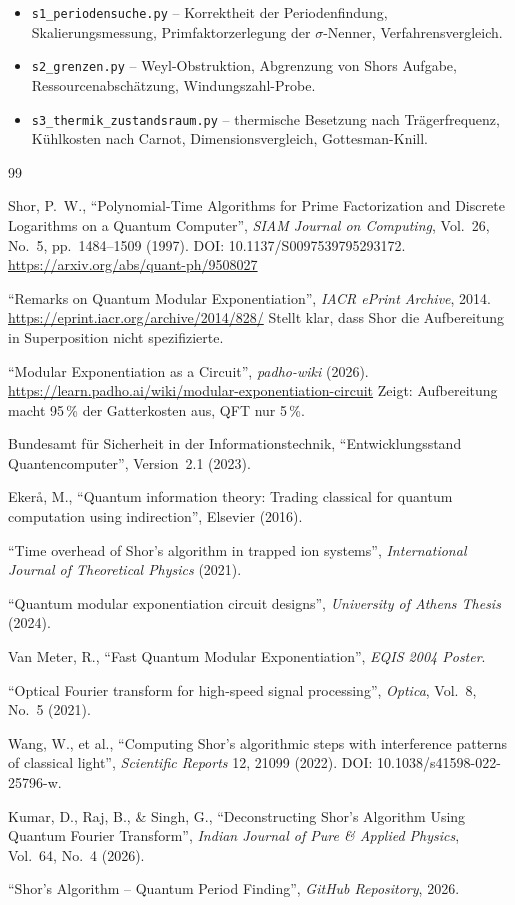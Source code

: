 \begin{itemize}
  \item \texttt{s1\_periodensuche.py} -- Korrektheit der Periodenfindung,
    Skalierungsmessung, Primfaktorzerlegung der $\sigma$-Nenner,
    Verfahrensvergleich.
  \item \texttt{s2\_grenzen.py} -- Weyl-Obstruktion, Abgrenzung von
    Shors Aufgabe, Ressourcenabschätzung, Windungszahl-Probe.
  \item \texttt{s3\_thermik\_zustandsraum.py} -- thermische Besetzung nach
    Trägerfrequenz, Kühlkosten nach Carnot, Dimensionsvergleich,
    Gottesman-Knill.
\end{itemize}

\begin{thebibliography}{99}

Shor, P.~W., ``Polynomial-Time Algorithms for Prime Factorization and
Discrete Logarithms on a Quantum Computer'',
\emph{SIAM Journal on Computing}, Vol.~26, No.~5, pp.~1484--1509 (1997).
DOI: 10.1137/S0097539795293172.
\url{https://arxiv.org/abs/quant-ph/9508027}

``Remarks on Quantum Modular Exponentiation'',
\emph{IACR ePrint Archive}, 2014.
\url{https://eprint.iacr.org/archive/2014/828/}
Stellt klar, dass Shor die Aufbereitung in Superposition nicht
spezifizierte.

``Modular Exponentiation as a Circuit'',
\emph{padho-wiki} (2026).
\url{https://learn.padho.ai/wiki/modular-exponentiation-circuit}
Zeigt: Aufbereitung macht 95\,\% der Gatterkosten aus, QFT nur 5\,\%.

Bundesamt für Sicherheit in der Informationstechnik,
``Entwicklungsstand Quantencomputer'', Version~2.1 (2023).

Ekerå, M., ``Quantum information theory: Trading classical for quantum
computation using indirection'', Elsevier (2016).

``Time overhead of Shor's algorithm in trapped ion systems'',
\emph{International Journal of Theoretical Physics} (2021).

``Quantum modular exponentiation circuit designs'',
\emph{University of Athens Thesis} (2024).

Van Meter, R., ``Fast Quantum Modular Exponentiation'',
\emph{EQIS 2004 Poster}.

``Optical Fourier transform for high-speed signal processing'',
\emph{Optica}, Vol.~8, No.~5 (2021).

Wang, W., et al., ``Computing Shor's algorithmic steps with interference
patterns of classical light'',
\emph{Scientific Reports} 12, 21099 (2022).
DOI: 10.1038/s41598-022-25796-w.

Kumar, D., Raj, B., \& Singh, G.,
``Deconstructing Shor's Algorithm Using Quantum Fourier Transform'',
\emph{Indian Journal of Pure \& Applied Physics}, Vol.~64, No.~4 (2026).

``Shor's Algorithm -- Quantum Period Finding'',
\emph{GitHub Repository}, 2026.

\end{thebibliography}
